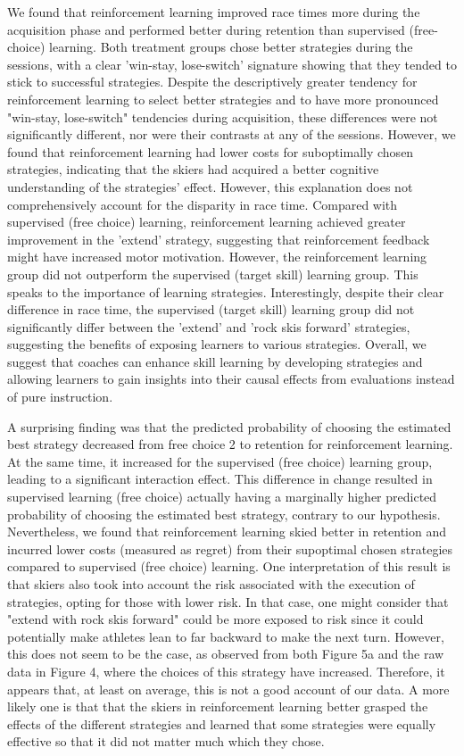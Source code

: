 We found that reinforcement learning improved race times more during the acquisition phase and performed better during retention than supervised (free-choice) learning. Both treatment groups chose better strategies during the sessions, with a clear 'win-stay, lose-switch' signature showing that they tended to stick to successful strategies. Despite the descriptively greater tendency for reinforcement learning to select better strategies and to have more pronounced "win-stay, lose-switch" tendencies during acquisition, these differences were not significantly different, nor were their contrasts at any of the sessions. However, we found that reinforcement learning had lower costs for suboptimally chosen strategies, indicating that the skiers had acquired a better cognitive understanding of the strategies' effect. However, this explanation does not comprehensively account for the disparity in race time. Compared with supervised (free choice) learning, reinforcement learning achieved greater improvement in the 'extend' strategy, suggesting that reinforcement feedback might have increased motor motivation. However, the reinforcement learning group did not outperform the supervised (target skill) learning group. This speaks to the importance of learning strategies. Interestingly, despite their clear difference in race time, the supervised (target skill) learning group did not significantly differ between the 'extend' and 'rock skis forward' strategies, suggesting the benefits of exposing learners to various strategies. Overall, we suggest that coaches can enhance skill learning by developing strategies and allowing learners to gain insights into their causal effects from evaluations instead of pure instruction.



A surprising finding was that the predicted probability of choosing the estimated best strategy decreased from free choice 2 to retention for reinforcement learning. At the same time, it increased for the supervised (free choice) learning group, leading to a significant interaction effect. This difference in change resulted in supervised learning (free choice) actually having a marginally higher predicted probability of choosing the estimated best strategy, contrary to our hypothesis. Nevertheless, we found that reinforcement learning skied better in retention and incurred lower costs (measured as regret) from their supoptimal chosen strategies compared to supervised (free choice) learning. One interpretation of this result is that skiers also took into account the risk associated with the execution of strategies, opting for those with lower risk. In that case, one might consider that "extend with rock skis forward" could be more exposed to risk since it could potentially make athletes lean to far backward to make the next turn.  However, this does not seem to be the case, as observed from both Figure 5a and the raw data in Figure 4, where the choices of this strategy have increased. Therefore, it appears that, at least on average, this is not a good account of our data. A more likely one is that that the skiers in reinforcement learning better grasped the effects of the different strategies and learned that some strategies were equally effective so that it did not matter much which they chose.

